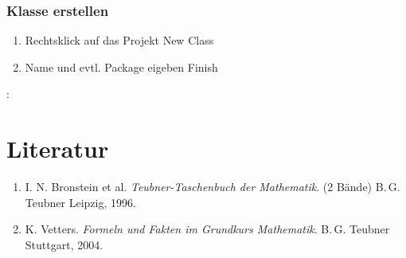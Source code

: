 		\subsubsection{Klasse erstellen}
		\begin{enumerate}
		\item Rechtsklick auf das Projekt \frqq New \frqq Class
		\item Name und evtl. Package eigeben \frqq Finish
		\end{enumerate}


:
\section{Literatur}

\renewcommand{\labelenumi}{[\arabic{enumi}]}
\renewcommand{\theenumi}{[\arabic{enumi}]}
\begin{enumerate}
\item
I. N. Bronstein et al. \textit{Teubner-Taschenbuch der Mathematik}. (2 Bände)
B.\,G. Teubner Leipzig, 1996.

\item
K. Vetters. \textit{Formeln und Fakten im Grundkurs Mathematik}. B.\,G. Teubner Stuttgart, 2004.

\end{enumerate}
\pagestyle{scrplain}
\ofoot[]{}

\cleardoublepage
%
